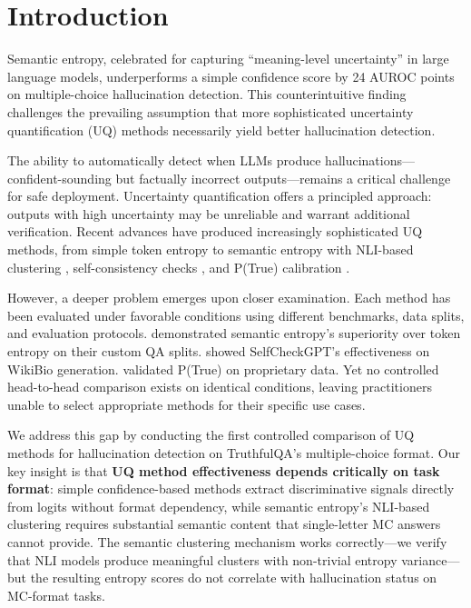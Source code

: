 \section{Introduction}

Semantic entropy, celebrated for capturing ``meaning-level uncertainty'' in large language models, underperforms a simple confidence score by 24 AUROC points on multiple-choice hallucination detection. This counterintuitive finding challenges the prevailing assumption that more sophisticated uncertainty quantification (UQ) methods necessarily yield better hallucination detection.

The ability to automatically detect when LLMs produce hallucinations---confident-sounding but factually incorrect outputs---remains a critical challenge for safe deployment. Uncertainty quantification offers a principled approach: outputs with high uncertainty may be unreliable and warrant additional verification. Recent advances have produced increasingly sophisticated UQ methods, from simple token entropy to semantic entropy with NLI-based clustering \citep{kuhn2023semantic}, self-consistency checks \citep{manakul2023selfcheckgpt}, and P(True) calibration \citep{kadavath2022language}.

However, a deeper problem emerges upon closer examination. Each method has been evaluated under favorable conditions using different benchmarks, data splits, and evaluation protocols. \citet{kuhn2023semantic} demonstrated semantic entropy's superiority over token entropy on their custom QA splits. \citet{manakul2023selfcheckgpt} showed SelfCheckGPT's effectiveness on WikiBio generation. \citet{kadavath2022language} validated P(True) on proprietary data. Yet no controlled head-to-head comparison exists on identical conditions, leaving practitioners unable to select appropriate methods for their specific use cases.

We address this gap by conducting the first controlled comparison of UQ methods for hallucination detection on TruthfulQA's multiple-choice format. Our key insight is that \textbf{UQ method effectiveness depends critically on task format}: simple confidence-based methods extract discriminative signals directly from logits without format dependency, while semantic entropy's NLI-based clustering requires substantial semantic content that single-letter MC answers cannot provide. The semantic clustering mechanism works correctly---we verify that NLI models produce meaningful clusters with non-trivial entropy variance---but the resulting entropy scores do not correlate with hallucination status on MC-format tasks.

